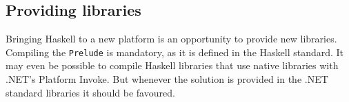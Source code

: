 \documentclass[en]{pracamgr}
\begin{document}
\subsection{Providing libraries}
Bringing Haskell to a new platform is an opportunity to provide new libraries.
Compiling the \texttt{Prelude} is mandatory, as it is defined in the Haskell standard.
It may even be possible to compile Haskell libraries that use native libraries
with .NET's Platform Invoke.
But whenever the solution is provided in the .NET standard libraries it should be favoured.

\printbibliography[heading=bibintoc]
\end{document}
